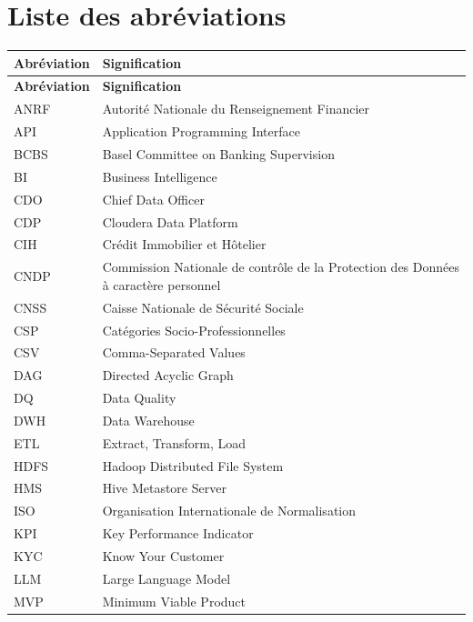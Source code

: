 \chapter*{Liste des abréviations}

\begin{longtable}{|l|p{12cm}|}
    \hline
    \textbf{Abréviation} & \textbf{Signification} \\
    \hline
    \endfirsthead
    \hline
    \textbf{Abréviation} & \textbf{Signification} \\
    \hline
    \endhead
    ANRF & Autorité Nationale du Renseignement Financier \\ \hline
    API & Application Programming Interface \\ \hline
    BCBS & Basel Committee on Banking Supervision \\ \hline
    BI & Business Intelligence \\ \hline
    CDO & Chief Data Officer \\ \hline
    CDP & Cloudera Data Platform \\ \hline
    CIH & Crédit Immobilier et Hôtelier \\ \hline
    CNDP & Commission Nationale de contrôle de la Protection des Données à caractère personnel \\ \hline
    CNSS & Caisse Nationale de Sécurité Sociale \\ \hline
    CSP & Catégories Socio-Professionnelles \\ \hline
    CSV & Comma-Separated Values \\ \hline
    DAG & Directed Acyclic Graph \\ \hline
    DQ & Data Quality \\ \hline
    DWH & Data Warehouse \\ \hline
    ETL & Extract, Transform, Load \\ \hline
    HDFS & Hadoop Distributed File System \\ \hline
    HMS & Hive Metastore Server \\ \hline
    ISO & Organisation Internationale de Normalisation \\ \hline
    KPI & Key Performance Indicator \\ \hline
    KYC & Know Your Customer \\ \hline
    LLM & Large Language Model \\ \hline
    MVP & Minimum Viable Product \\ \hline

\end{longtable}

